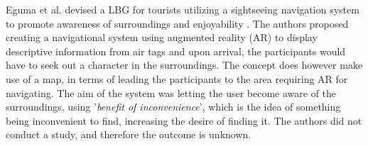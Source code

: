 

Eguma et al. devised a LBG for tourists utilizing a sightseeing navigation system to promote awareness of surroundings and enjoyability \cite{HideAndSeek}. The authors proposed creating a navigational system using augmented reality (AR) to display descriptive information from air tags and upon arrival, the participants would have to seek out a character in the surroundings. The concept does however make use of a map, in terms of leading the participants to the area requiring AR for navigating. The aim of the system was letting the user become aware of the surroundings, using '\textit{benefit of inconvenience}', which is the idea of something being inconvenient to find, increasing the desire of finding it. The authors did not conduct a study, and therefore the outcome is unknown.

